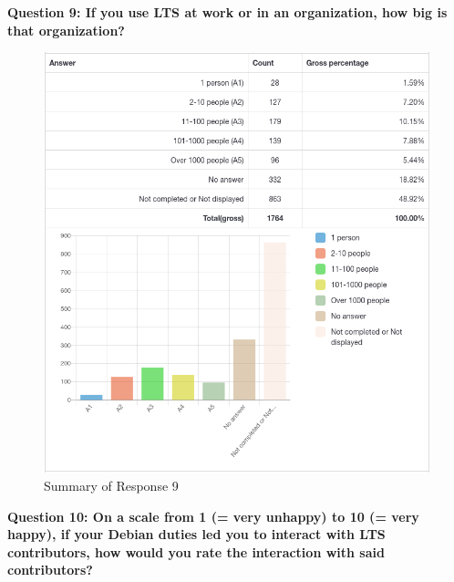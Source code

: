 \documentclass{article}
\begin{document}
\newpage

\Large{\textbf{Question 9: If you use LTS at work or in an organization, how big is that organization?}}

\vspace{3mm}
\begin{figure}[h!]
\centering
\includegraphics[width=16.5cm]{assets/9-summary.png}
\caption{Summary of Response 9}
\end{figure}

\newpage

\large{\textbf{Question 10: On a scale from 1 (= very unhappy) to 10 (= very happy), if your Debian duties
led you to interact with LTS contributors, how would you rate the interaction with said contributors?}}
\end{document}
